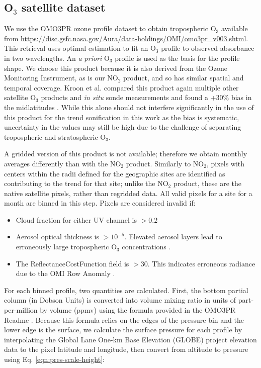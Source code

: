 \documentclass[a4paper,10pt,oneside]{article}
\newcommand{\ce}[1]{$\mathrm{#1}$}
\begin{document}
\begin{sloppy}
\subsection{O$_3$ satellite dataset}

	We use the OMO3PR ozone profile dataset to obtain tropospheric \ce{O_3} available from \url{https://disc.gsfc.nasa.gov/Aura/data-holdings/OMI/omo3pr_v003.shtml}.   This retrieval uses optimal estimation to fit an \ce{O_3} profile to observed absorbance in two wavelengths. An \emph{a priori} \ce{O_3} profile is used as the basis for the profile shape.  We choose this product because it is also derived from the Ozone Monitoring Instrument, as is our \ce{NO_2} product, and so has similar spatial and temporal coverage. Kroon et al. compared this product again multiple other satellite \ce{O_3} products and \emph{in situ} sonde measurements and found a +30\% bias in the midlatitudes  \cite{kroon11}. While this alone should not interfere significantly in the use of this product for the trend sonification in this work as the bias is systematic, uncertainty in the values may still be high due to the challenge of separating tropospheric and stratospheric \ce{O_3}.
	
	A gridded version of this product is not available; therefore we obtain monthly averages differently than with the \ce{NO_2} product. Similarly to \ce{NO_2}, pixels with centers within the radii defined for the geographic sites are identified as contributing to the trend for that site; unlike the \ce{NO_2} product, these are the native satellite pixels, rather than regridded data. All valid pixels for a site for a month are binned in this step. Pixels are considered invalid if:
	
	\begin{itemize}
	\item Cloud fraction for either UV channel is $> 0.2$
	\item Aerosol optical thickness is $> 10^{-5}$. Elevated aerosol layers lead to erroneously large tropospheric \ce{O_3} concentrations \cite{omo3pr-readme}.
	\item The ReflectanceCostFunction field is $> 30$. This indicates erroneous radiance due to the OMI Row Anomaly \cite{row-anomaly}.
	\end{itemize}
	
	For each binned profile, two quantities are calculated. First, the bottom partial column (in Dobson Units) is converted into volume mixing ratio in units of part-per-million by volume (ppmv) using the formula provided in the OMO3PR Readme \cite{omo3pr-readme}. Because this formula relies on the edges of the pressure bin and the lower edge is the surface, we calculate the surface pressure for each profile by interpolating the Global Lane One-km Base Elevation (GLOBE) project elevation data \cite{globe} to the pixel latitude and longitude, then convert from altitude to pressure using Eq. \eqref{eqn:pres-scale-height}:
	

\end{sloppy}
\end{document}
